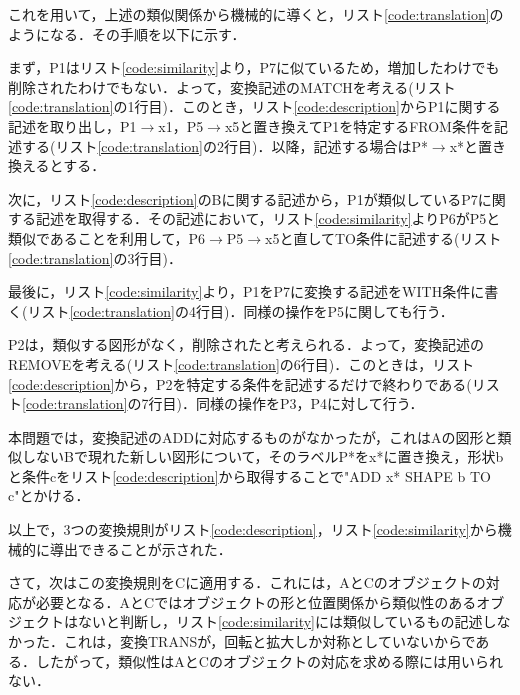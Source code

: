 \documentclass{jarticle}
\begin{document}
これを用いて，上述の類似関係から機械的に導くと，リスト\ref{code:translation}のようになる．その手順を以下に示す．

まず，P1はリスト\ref{code:similarity}より，P7に似ているため，増加したわけでも削除されたわけでもない．よって，変換記述のMATCHを考える(リスト\ref{code:translation}の1行目)．このとき，リスト\ref{code:description}からP1に関する記述を取り出し，P1$\to$x1，P5$\to$x5と置き換えてP1を特定するFROM条件を記述する(リスト\ref{code:translation}の2行目)．以降，記述する場合はP*$\to$x*と置き換えるとする．

次に，リスト\ref{code:description}のBに関する記述から，P1が類似しているP7に関する記述を取得する．その記述において，リスト\ref{code:similarity}よりP6がP5と類似であることを利用して，P6$\to$P5$\to$x5と直してTO条件に記述する(リスト\ref{code:translation}の3行目)．

最後に，リスト\ref{code:similarity}より，P1をP7に変換する記述をWITH条件に書く(リスト\ref{code:translation}の4行目)．同様の操作をP5に関しても行う．

P2は，類似する図形がなく，削除されたと考えられる．よって，変換記述のREMOVEを考える(リスト\ref{code:translation}の6行目)．このときは，リスト\ref{code:description}から，P2を特定する条件を記述するだけで終わりである(リスト\ref{code:translation}の7行目)．同様の操作をP3，P4に対して行う．

本問題では，変換記述のADDに対応するものがなかったが，これはAの図形と類似しないBで現れた新しい図形について，そのラベルP*をx*に置き換え，形状bと条件cをリスト\ref{code:description}から取得することで"ADD x* SHAPE b TO c"とかける．

以上で，3つの変換規則がリスト\ref{code:description}，リスト\ref{code:similarity}から機械的に導出できることが示された．
\lstset{style=customplain}






さて，次はこの変換規則をCに適用する．これには，AとCのオブジェクトの対応が必要となる．AとCではオブジェクトの形と位置関係から類似性のあるオブジェクトはないと判断し，リスト\ref{code:similarity}には類似しているもの記述しなかった．これは，変換TRANSが，回転と拡大しか対称としていないからである．したがって，類似性はAとCのオブジェクトの対応を求める際には用いられない．
\end{document}
